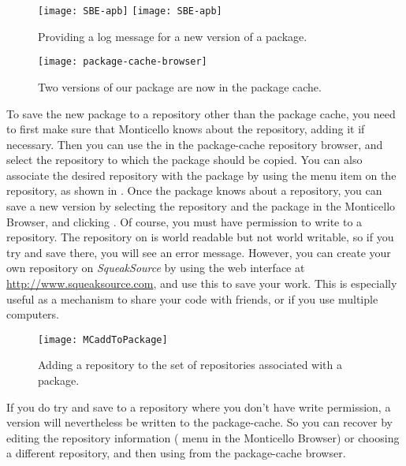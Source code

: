 \documentclass[a4paper,10pt,twoside]{book}
\begin{document}
\begin{figure}[tbp]
	\begin{center}
	\ifluluelse
		{\texttt{[image: SBE-apb]}}
		{\texttt{[image: SBE-apb]}}
	\end{center}
	\caption{Providing a log message for a new version of a package.}
	\label{fig:SBE-apb}
\end{figure}

\begin{figure}[tbp]
	\begin{center}
	\texttt{[image: package-cache-browser]}
	\end{center}
	\caption{Two versions of our package are now in the package cache.}
	\label{fig:package-cache-browser}
\end{figure}

To save the new package to a repository other than the package cache, you need to first make sure that Monticello knows about the repository, adding it if necessary.  
Then you can use the  in the package-cache repository browser, and select the repository to which the package should be copied.  
You can also associate the desired repository with the package by using the  menu item  on the repository, as shown in .  
Once the package knows about a repository, you can save a new version by selecting the repository and the package in the Monticello Browser, and clicking .  
Of course, you must have permission to write to a repository.  
The  repository on  is world readable but not world writable, so if you try and save there, you will see an error message.  
However, you can create your own repository on \emph{SqueakSource} by using the web interface at \url{http://www.squeaksource.com}, and use this to save your work. 
This is especially useful as a mechanism to share your code with friends, or if you use multiple computers.

\begin{figure}[tbp]
	\begin{center}
		\texttt{[image: MCaddToPackage]}
	\end{center}
	\caption{Adding a repository to the set of repositories associated with a package.}
	\label{fig:associateRepository}
\end{figure}

If you do try and save to a repository where you don't have write permission, a version will nevertheless be written to the package-cache.  
So you can recover by editing the repository information ( menu in the Monticello Browser) or choosing a different repository, and then using  from the package-cache browser.
\end{document}
